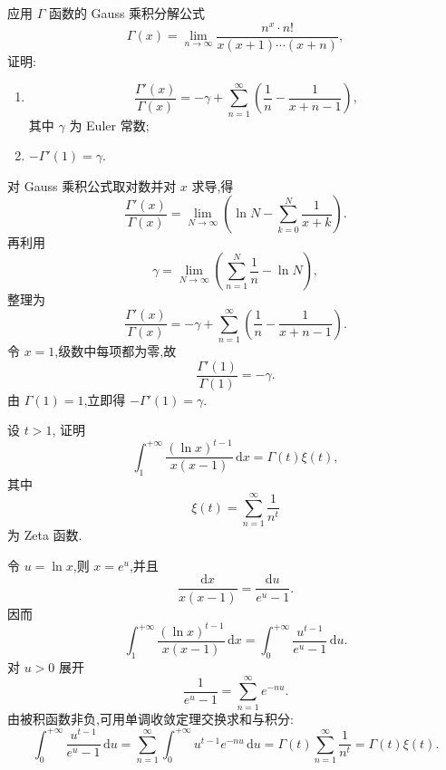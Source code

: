\begin{example}[\markstar]
    应用 $\Gamma$ 函数的 Gauss 乘积分解公式
    \[
        \Gamma(x)=\lim\limits_{n\to\infty}\dfrac{n^x\cdot n!}{x(x+1)\cdots(x+n)},
    \]
    证明:
    \begin{enumerate}
        \item
              \[
                  \dfrac{\Gamma'(x)}{\Gamma(x)}
                  =-\gamma+\sum\limits_{n=1}^{\infty}\left(\dfrac{1}{n}-\dfrac{1}{x+n-1}\right),
              \]
              其中 $\gamma$ 为 Euler 常数;
        \item $-\Gamma'(1)=\gamma$.
    \end{enumerate}
\end{example}
\exampleblank

\begin{solution}
    对 Gauss 乘积公式取对数并对 $x$ 求导,得
    \[
        \dfrac{\Gamma'(x)}{\Gamma(x)}
        =\lim\limits_{N\to\infty}
        \left(\ln N-\sum\limits_{k=0}^N\dfrac{1}{x+k}\right).
    \]
    再利用
    \[
        \gamma=\lim\limits_{N\to\infty}
        \left(\sum\limits_{n=1}^N\dfrac{1}{n}-\ln N\right),
    \]
    整理为
    \[
        \dfrac{\Gamma'(x)}{\Gamma(x)}
        =-\gamma+\sum\limits_{n=1}^{\infty}
        \left(\dfrac{1}{n}-\dfrac{1}{x+n-1}\right).
    \]
    令 $x=1$,级数中每项都为零,故
    \[
        \dfrac{\Gamma'(1)}{\Gamma(1)}=-\gamma.
    \]
    由 $\Gamma(1)=1$,立即得 $-\Gamma'(1)=\gamma$.
\end{solution}

\begin{example}[\markstar]
    设 $t>1$, 证明
    \[
        \int_1^{+\infty}\dfrac{(\ln x)^{t-1}}{x(x-1)}\,\mathrm{d}x
        =\Gamma(t)\xi(t),
    \]
    其中
    \[
        \xi(t)=\sum\limits_{n=1}^{\infty}\dfrac{1}{n^t}
    \]
    为 Zeta 函数.
\end{example}
\exampleblank

\begin{solution}
    令 $u=\ln x$,则 $x=e^u$,并且
    \[
        \dfrac{\mathrm{d}x}{x(x-1)}=\dfrac{\mathrm{d}u}{e^u-1}.
    \]
    因而
    \[
        \int_1^{+\infty}\dfrac{(\ln x)^{t-1}}{x(x-1)}\,\mathrm{d}x
        =\int_0^{+\infty}\dfrac{u^{t-1}}{e^u-1}\,\mathrm{d}u.
    \]
    对 $u>0$ 展开
    \[
        \dfrac{1}{e^u-1}=\sum\limits_{n=1}^{\infty}e^{-nu}.
    \]
    由被积函数非负,可用单调收敛定理交换求和与积分:
    \[
        \int_0^{+\infty}\dfrac{u^{t-1}}{e^u-1}\,\mathrm{d}u
        =\sum\limits_{n=1}^{\infty}\int_0^{+\infty}u^{t-1}e^{-nu}\,\mathrm{d}u
        =\Gamma(t)\sum\limits_{n=1}^{\infty}\dfrac{1}{n^t}
        =\Gamma(t)\xi(t).
    \]
\end{solution}
